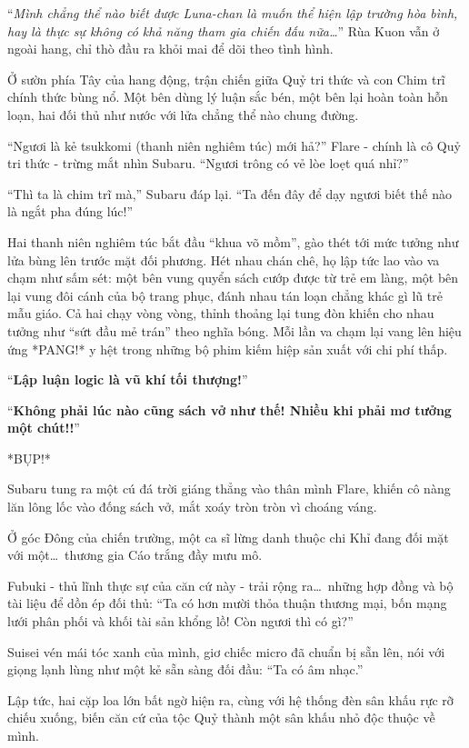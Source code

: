 \documentclass[../main.tex]{subfiles}
\begin{document}
``\textit{Mình chẳng thể nào biết được Luna-chan là muốn thể hiện lập trường hòa bình, hay là thực sự không có khả năng tham gia chiến đấu nữa\dots}'' Rùa Kuon vẫn ở ngoài hang, chỉ thò đầu ra khỏi mai để dõi theo tình hình.

Ở sườn phía Tây của hang động, trận chiến giữa Quỷ tri thức và con Chim trĩ chính thức bùng nổ. Một bên dùng lý luận sắc bén, một bên lại hoàn toàn hỗn loạn, hai đối thủ như nước với lửa chẳng thể nào chung đường.

``Ngươi là kẻ tsukkomi (thanh niên nghiêm túc) mới hả?'' Flare - chính là cô Quỷ tri thức - trừng mắt nhìn Subaru. ``Ngươi trông có vẻ lòe loẹt quá nhỉ?''

``Thì ta là chim trĩ mà,'' Subaru đáp lại. ``Ta đến đây để dạy ngươi biết thế nào là ngắt pha đúng lúc!''

Hai thanh niên nghiêm túc bắt đầu ``khua võ mồm'', gào thét tới mức tưởng như lửa bùng lên trước mặt đối phương. Hét nhau chán chê, họ lập tức lao vào va chạm như sấm sét: một bên vung quyển sách cướp được từ trẻ em làng, một bên lại vung đôi cánh của bộ trang phục, đánh nhau tán loạn chẳng khác gì lũ trẻ mẫu giáo. Cả hai chạy vòng vòng, thỉnh thoảng lại tung đòn khiến cho nhau tưởng như ``sứt đầu mẻ trán'' theo nghĩa bóng. Mỗi lần va chạm lại vang lên hiệu ứng *PANG!* y hệt trong những bộ phim kiếm hiệp sản xuất với chi phí thấp.

``\textbf{Lập luận logic là vũ khí tối thượng!}''

``\textbf{Không phải lúc nào cũng sách vở như thế! Nhiều khi phải mơ tưởng một chút!!}''

*BỤP!*

Subaru tung ra một cú đá trời giáng thẳng vào thân mình Flare, khiến cô nàng lăn lông lốc vào đống sách vở, mắt xoáy tròn tròn vì choáng váng.

\ct

Ở góc Đông của chiến trường, một ca sĩ lừng danh thuộc chi Khỉ đang đối mặt với một\dots\ thương gia Cáo trắng đầy mưu mô.

Fubuki - thủ lĩnh thực sự của căn cứ này - trải rộng ra\dots\ những hợp đồng và bộ tài liệu để dồn ép đối thủ: ``Ta có hơn mười thỏa thuận thương mại, bốn mạng lưới phân phối và khối tài sản khổng lồ! Còn ngươi thì có gì?''

Suisei vén mái tóc xanh của mình, giơ chiếc micro đã chuẩn bị sẵn lên, nói với giọng lạnh lùng như một kẻ sẵn sàng đối đầu: ``Ta có âm nhạc.''

Lập tức, hai cặp loa lớn bất ngờ hiện ra, cùng với hệ thống đèn sân khấu rực rỡ chiếu xuống, biến căn cứ của tộc Quỷ thành một sân khấu nhỏ độc thuộc về mình.
\end{document}
